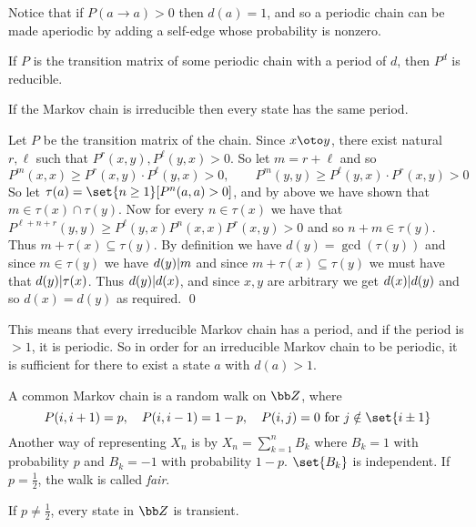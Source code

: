 \edefn

Notice that if $P(a\to a)>0$ then $d(a)=1$, and so a periodic chain can be made aperiodic by adding a self-edge whose probability is nonzero.

\bprop

    If $P$ is the transition matrix of some periodic chain with a period of $d$, then $P^d$ is reducible.

\eprop

\bprop

    If the Markov chain is irreducible then every state has the same period.

\eprop

Let $P$ be the transition matrix of the chain.
Since $x\oto y$, there exist natural $r,\ell$ such that $P^r(x,y),P^\ell(y,x)>0$.
So let $m=r+\ell$ and so
$$ P^m(x,x) \geq P^r(x,y)\cdot P^\ell(y,x) > 0,\qquad P^m(y,y) \geq P^\ell(y,x)\cdot P^r(x,y) > 0 $$
So let $\tau(a)=\set{n\geq1}[P^n(a,a)>0]$, and by above we have shown that $m\in\tau(x)\cap\tau(y)$.
Now for every $n\in\tau(x)$ we have that $P^{\ell+n+r}(y,y)\geq P^\ell(y,x)P^n(x,x)P^r(x,y)>0$ and so $n+m\in\tau(y)$.
Thus $m+\tau(x)\subseteq\tau(y)$.
By definition we have $d(y)=\gcd(\tau(y))$ and since $m\in\tau(y)$ we have $d(y){\mid} m$ and since $m+\tau(x)\subseteq\tau(y)$ we must have that $d(y){\mid}\tau(x)$.
Thus $d(y){\mid} d(x)$, and since $x,y$ are arbitrary we get $d(x){\mid} d(y)$ and so $d(x)=d(y)$ as required.
\qed

This means that every irreducible Markov chain has a period, and if the period is $>1$, it is periodic.
So in order for an irreducible Markov chain to be periodic, it is sufficient for there to exist a state $a$ with $d(a)>1$.

A common Markov chain is a random walk on ${\bb Z}$, where
$$ P(i,i+1) = p,\quad P(i,i-1) = 1-p,\quad P(i,j)=0\hbox{ for $j\notin\set{i\pm 1}$} $$
Another way of representing $X_n$ is by $X_n=\sum_{k=1}^nB_k$ where $B_k=1$ with probability $p$ and $B_k=-1$ with probability $1-p$.
$\set{B_k}$ is independent.
If $p=\frac12$, the walk is called {\it fair}.

\bthrm

    If $p\neq\frac12$, every state in ${\bb Z}$ is transient.

\ethrm


